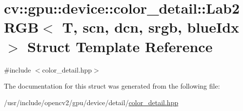 \hypertarget{structcv_1_1gpu_1_1device_1_1color__detail_1_1Lab2RGB}{\section{cv\-:\-:gpu\-:\-:device\-:\-:color\-\_\-detail\-:\-:Lab2\-R\-G\-B$<$ T, scn, dcn, srgb, blue\-Idx $>$ Struct Template Reference}
\label{structcv_1_1gpu_1_1device_1_1color__detail_1_1Lab2RGB}
}


{\ttfamily \#include $<$color\-\_\-detail.\-hpp$>$}



The documentation for this struct was generated from the following file\-:\begin{DoxyCompactItemize}
\item 
/usr/include/opencv2/gpu/device/detail/\hyperlink{color__detail_8hpp}{color\-\_\-detail.\-hpp}\end{DoxyCompactItemize}

